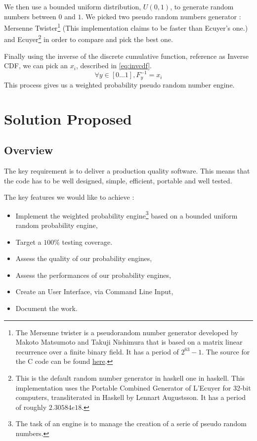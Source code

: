 \documentclass[12pt,a4paper,article]{memoir} %
\begin{document}
We then use a bounded uniform distribution, $U\left(0,1\right)$,
to generate random numbers between $0$ and $1$.
We picked two pseudo random numbers generator : Mersenne Twister\footnote{
The Mersenne twister is a pseudorandom number generator developed by 
Makoto Matsumoto and Takuji Nishimura that is based on a matrix linear 
recurrence over a finite binary field. 
It has a period of $2^{63}-1$.
The source for the C code can be found 
\href{http://www.math.sci.hiroshima-u.ac.jp/~m-mat/MT/emt64.html}{here}.
} (This implementation claims to be faster than Ecuyer's one.) and Ecuyer\footnote{
This is the default random number generator in haskell one in haskell.
 This implementation uses the Portable Combined Generator of L'Ecuyer
 for 32-bit computers, transliterated in Haskell by Lennart Augustsson. 
 It has a period of roughly $2.30584e18$.
 } in order to compare and pick the best one.

Finally using the inverse of the discrete cumulative function, reference as Inverse CDF, 
we can pick an $x_i$, described in \autoref{eq:invcdf}.
\begin{equation}
	\forall y \in \left[0...1 \right], F^{-1}_y = x_i
	\label{eq:invcdf}
\end{equation}
This process gives us a weighted probability pseudo random number engine.

\section{Solution Proposed}
\subsection{Overview}

The key requirement is to deliver a production quality software.
This means that the code has to be well designed, simple, 
efficient, portable and well tested.

The key features we would like to achieve :
\begin{itemize}
	\item Implement the weighted probability engine\footnote{
		The task of an engine is to manage the creation of a serie of
		pseudo random numbers.} based
		on a bounded uniform random probability engine,
	\item Target a $100\%$ testing coverage.
	\item Assess the quality of our probability engines,
	\item Assess the performances of our probability engines,
	\item Create an User Interface, via Command Line Input,
	\item Document the work.
\end{itemize}
\end{document}
